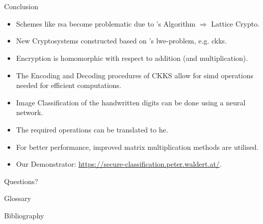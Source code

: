 \documentclass[aspectratio=169, onlytextwidth]{beamer}
\begin{document}
  

  \section*{}
  \begin{frame}{Conclusion}
    \begin{itemize}
      \item Schemes like \gls{rsa} become problematic due to 's Algorithm $\Rightarrow$ Lattice Crypto.
      \item New Cryptosystems constructed based on 's \gls{lwe}-problem, e.g. \gls{ckks}.
      \item Encryption is homomorphic with respect to addition (and multiplication).
      \item The Encoding and Decoding procedures of CKKS allow for \gls{simd} operations needed for efficient computations.
      \item Image Classification of the handwritten digits can be done using a neural network.
      \item The required operations can be translated to \gls{he}.
      \item For better performance, improved matrix multiplication methods are utilised.
      \item Our Demonstrator: \url{https://secure-classification.peter.waldert.at/}.
    \end{itemize}
  \end{frame}

  \begin{frame}[c]
    \centering
    \Large Questions?
  \end{frame}

  \begin{frame}[allowframebreaks]{Glossary}
    \printnoidxglossary[type=acronym]
  \end{frame}

  \begin{frame}[allowframebreaks]{Bibliography}
    \printbibliography
  \end{frame}

  
\end{document}
